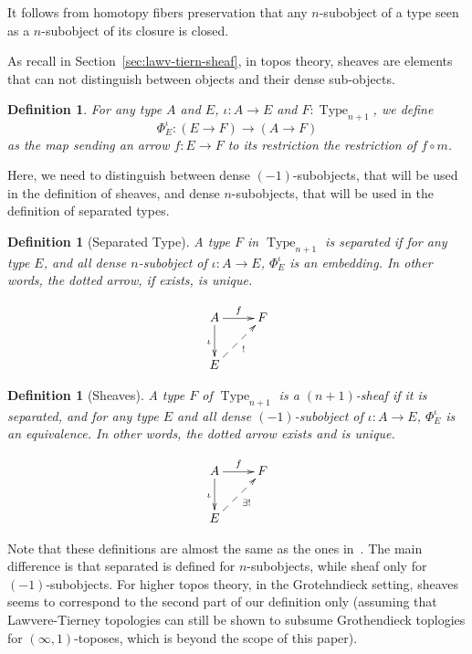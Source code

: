 \documentclass[conference]{IEEEtran}
\newtheorem{defi}[thm]{Definition}
\DeclareMathOperator{\Type}{Type}
\begin{document}
It follows from homotopy fibers preservation that any $n$-subobject of
a type seen as a $n$-subobject of its closure is closed.

As recall in Section~\ref{sec:lawv-tiern-sheaf}, in topos theory,
sheaves are elements that can not distinguish between objects and
their dense sub-objects. 

\begin{defi}
  For any type $A$ and $E$, $\iota : A \to E$ and $F:\Type_{n+1}$, we define
    $$
    \Phi_E^\iota : (E \to F) \to (A \to F) 
    $$
    as the map sending an
    arrow $f:E\to F$ to its restriction the restriction of $f \circ m$.
\end{defi}

Here, we need to distinguish between
dense $(-1)$-subobjects, that will be used in the definition of
sheaves, and dense $n$-subobjects, that will be used in the definition
of separated types. 

\begin{defi}[Separated Type]
  A type $F$ in $\Type_{n+1}$ is {\em separated} if for any type $E$, and
  all dense $n$-subobject of $\iota : A \to E$,
  $\Phi_E^\iota$ is an embedding. In other words, the dotted arrow,
  if exists, is unique.

  $$\xymatrix{
    A \ar[r]^f \ar[d]_{\iota} & F \\
    E \ar@{-->}[ru]_{!}&
  }$$
\end{defi}

\begin{defi}[Sheaves]
  A type $F$ of $\Type_{n+1}$ is a {\em $(n+1)$-sheaf} if it is
  separated, and for any type $E$ and all dense $(-1)$-subobject of
  $\iota : A \to E$, $\Phi_E^\iota$ is an
  equivalence. In other words, the dotted arrow exists and is unique.

  $$\xymatrix{
    A \ar[r]^f \ar[d]_{\iota} & F \\
    E \ar@{-->}[ru]_{\exists !}&
  }$$
\end{defi}

Note that these definitions are almost the same as the ones
in~\cite{maclanemoerdijk}. The main difference is that {separated}
is defined for $n$-subobjects, while {sheaf} only for
$(-1)$-subobjects.
%
For higher topos theory, in the Grotehndieck setting, sheaves seems
to correspond to the second part of our definition only (assuming that
Lawvere-Tierney topologies can still be shown to subsume Grothendieck
toplogies for $(\infty,1)$-toposes, which is beyond the scope of this paper).
%
\end{document}
